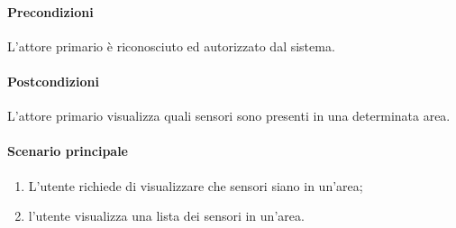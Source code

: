 \paragraph{Precondizioni} L'attore primario è riconosciuto ed autorizzato dal sistema.
\paragraph{Postcondizioni} L'attore primario visualizza quali sensori sono presenti in una determinata area.

\paragraph{Scenario principale}
\begin{enumerate}
    \item L'utente richiede di visualizzare che sensori siano in un'area;
    \item l'utente visualizza una lista dei sensori in un'area.
\end{enumerate}